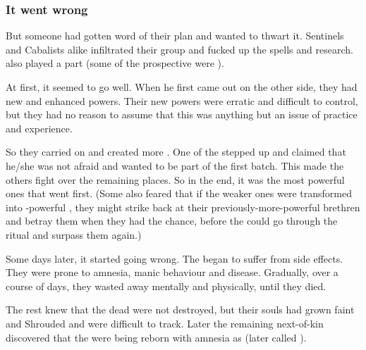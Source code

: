 \subsubsection{It went wrong}
But someone had gotten word of their plan and wanted to thwart it. 
Sentinels and Cabalists alike infiltrated their group and fucked up the spells and research. 
 also played a part (some of the prospective \malachim{} were \satharioth). 

At first, it seemed to go well. 
When he first \malachim{} came out on the other side, they had new and enhanced powers. 
Their new powers were erratic and difficult to control, but they had no reason to assume that this was anything but an issue of practice and experience. 

So they carried on and created more \malachim. 
One of the \satharioth{} stepped up and claimed that he/she was not afraid and wanted to be part of the first batch. 
This made the others fight over the remaining places. 
So in the end, it was the most powerful ones that went first. 
(Some also feared that if the weaker ones were transformed into \uber-powerful \malachim, they might strike back at their previously-more-powerful brethren and betray them when they had the chance, before the \satharioth{} could go through the ritual and surpass them again.)

Some days later, it started going wrong. 
The \malachim{} began to suffer from side effects. 
They were prone to amnesia, manic behaviour and disease. 
Gradually, over a course of days, they wasted away mentally and physically, until they died. 

The rest knew that the dead \malachim{} were not destroyed, but their souls had grown faint and Shrouded and were difficult to track. 
Later the remaining next-of-kin discovered that the \malachim{} were being reborn with amnesia as \humans{} (later called ). 

